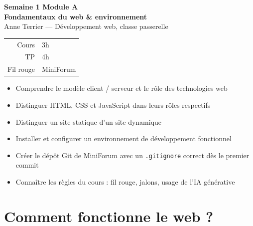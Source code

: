 \documentclass[a4paper,11pt]{article}
\begin{document}

\begin{tcolorbox}[
  colback=accentBlue, colframe=accentBlue,
  arc=4pt, left=12pt, right=12pt, top=10pt, bottom=10pt]
  \begin{minipage}{0.70\linewidth}
    {\color{cfptYellow}\Large\bfseries Semaine 1 \quad\textbar\quad Module A}\\[4pt]
    {\color{white}\Large\bfseries Fondamentaux du web \& environnement}\\[4pt]
    {\color{lightBlue}\normalsize Anne Terrier --- Développement web, classe passerelle}
  \end{minipage}
  \hfill
  \begin{minipage}{0.24\linewidth}
    \raggedleft
    \begin{tabular}{rl}
      \color{lightBlue}\small Cours & \color{white}\small 3h \\
      \color{lightBlue}\small TP    & \color{white}\small 4h \\
      \color{lightBlue}\small Fil rouge & \color{white}\small MiniForum \\
    \end{tabular}
  \end{minipage}
\end{tcolorbox}

\vspace{6pt}
\begin{tcolorbox}[definition, title={Objectifs de la semaine}]
\begin{itemize}
  \item Comprendre le modèle client / serveur et le rôle des technologies web
  \item Distinguer HTML, CSS et JavaScript dans leurs rôles respectifs
  \item Distinguer un site statique d'un site dynamique
  \item Installer et configurer un environnement de développement fonctionnel
  \item Créer le dépôt Git de MiniForum avec un \texttt{.gitignore} correct dès le premier commit
  \item Connaître les règles du cours : fil rouge, jalons, usage de l'IA générative
\end{itemize}
\end{tcolorbox}

\section{Comment fonctionne le web ?}
\end{document}
